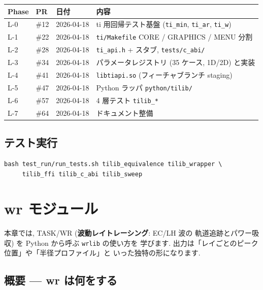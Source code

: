 \documentclass[11pt,a4paper]{report}
\begin{document}
\begin{center}
\begin{tabular}{@{}lllp{6.5cm}@{}}
\toprule
Phase & PR  & 日付        & 内容 \\ \midrule
L-0   & \#12 & 2026-04-18 & ti 用回帰テスト基盤 (\texttt{ti\_min}, \texttt{ti\_ar}, \texttt{ti\_w}) \\
L-1   & \#22 & 2026-04-18 & \texttt{ti/Makefile} CORE / GRAPHICS / MENU 分割 \\
L-2   & \#28 & 2026-04-18 & \texttt{ti\_api.h} + スタブ, \texttt{tests/c\_abi/} \\
L-3   & \#34 & 2026-04-18 & パラメータレジストリ (35 ケース, 1D/2D) と実装 \\
L-4   & \#41 & 2026-04-18 & \texttt{libtiapi.so} (フィーチャブランチ staging) \\
L-5   & \#47 & 2026-04-18 & Python ラッパ \texttt{python/tilib/} \\
L-6   & \#57 & 2026-04-18 & 4 層テスト \texttt{tilib\_*} \\
L-7   & \#64 & 2026-04-18 & ドキュメント整備 \\
\bottomrule
\end{tabular}
\end{center}

\section{テスト実行}

\begin{lstlisting}[style=bash]
bash test_run/run_tests.sh tilib_equivalence tilib_wrapper \
     tilib_ffi tilib_c_abi tilib_sweep
\end{lstlisting}

\clearpage
\chapter{wr モジュール}
\label{ch:wr}

\begin{learn}
本章では, TASK/WR (\textbf{波動レイトレーシング}: EC/LH 波の
軌道追跡とパワー吸収) を Python から呼ぶ \texttt{wrlib} の使い方を
学びます. 出力は「レイごとのピーク位置」や「半径プロファイル」と
いった独特の形になります.
\end{learn}

\section{概要 — wr は何をする}
\end{document}
